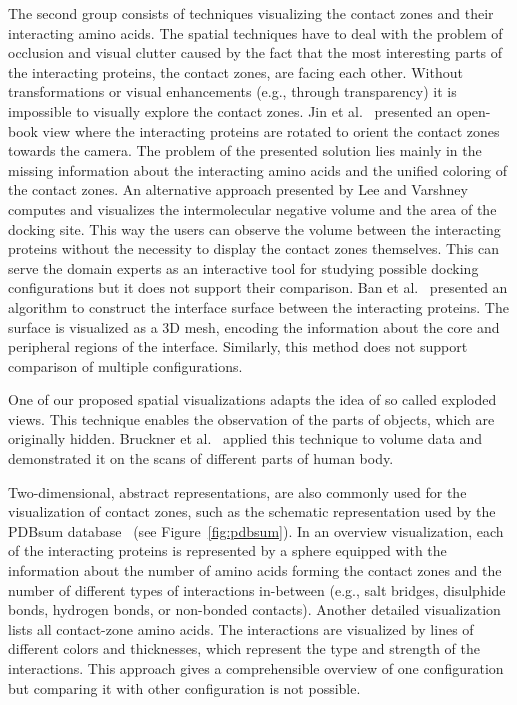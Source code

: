 \documentclass{bmcart}
\begin{document}
The second group consists of techniques visualizing the contact zones and their interacting amino acids.
The spatial techniques have to deal with the problem of occlusion and visual clutter caused by the fact that the most interesting parts of the interacting proteins, the contact zones, are facing each other.
Without transformations or visual enhancements (e.g., through transparency) it is impossible to visually explore the contact zones.
Jin et al.~\cite{Jin2014} presented an open-book view where the interacting proteins are rotated to orient the contact zones towards the camera.
The problem of the presented solution lies mainly in the missing information about the interacting amino acids and the unified coloring of the contact zones.
An alternative approach presented by Lee and Varshney~\cite{Varshney2003} computes and visualizes the intermolecular negative volume and the area of the docking site. %
This way the users can observe the volume between the interacting proteins without the necessity to display the contact zones themselves.
This can serve the domain experts as an interactive tool for studying possible docking configurations but it does not support their comparison.
Ban et al.~\cite{Ban2006} presented an algorithm to construct the interface surface between the interacting proteins.
The surface is visualized as a 3D mesh, encoding the information about the core and peripheral regions of the interface. 
Similarly, this method does not support comparison of multiple configurations.

One of our proposed spatial visualizations adapts the idea of so called exploded views.
This technique enables the observation of the parts of objects, which are originally hidden.
Bruckner et al.~\cite{Bruckner2006} applied this technique to volume data and demonstrated it on the scans of different parts of human body.

Two-dimensional, abstract representations, are also commonly used for the visualization of contact zones, such as the schematic representation used by the PDBsum database~\cite{pdbsum} (see Figure~\ref{fig:pdbsum}).
In an overview visualization, each of the interacting proteins is represented by a sphere equipped with the information about the number of amino acids forming the contact zones and the number of different types of interactions in-between (e.g., salt bridges, disulphide bonds, hydrogen bonds, or non-bonded contacts).
Another detailed visualization lists all contact-zone amino acids. 
The interactions are visualized by lines of different colors and thicknesses, which represent the type and strength of the interactions. 
This approach gives a comprehensible overview of one configuration but comparing it with other configuration is not possible.
\end{document}
